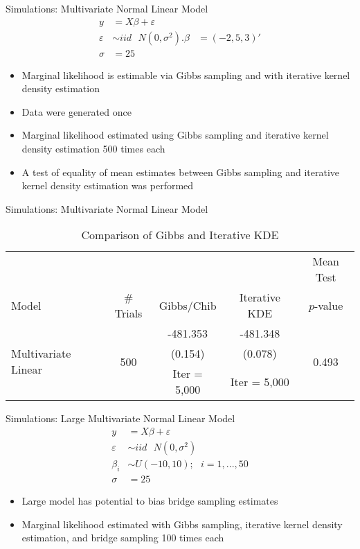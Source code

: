 \documentclass{beamer}
\newcommand{\ep}{\varepsilon}
\begin{document}
\begin{frame}{Simulations: Multivariate Normal Linear Model}
\begin{subequations}
	\begin{align}
	y &= X\beta + \ep \\
	\ep &\sim iid \mbox{ }N(0, \sigma^2). 
	\beta &= (-2, 5, 3)'\\
	\sigma &= 25
	\end{align}
\end{subequations}

\begin{itemize}
	\item Marginal likelihood is estimable via Gibbs sampling and with iterative kernel density estimation
	\item Data were generated once
	\item Marginal likelihood estimated using Gibbs sampling and iterative kernel density estimation 500 times each
	\item A test of equality of mean estimates between Gibbs sampling and iterative kernel density estimation was performed
\end{itemize}
\end{frame}

\begin{frame}{Simulations: Multivariate Normal Linear Model}
\begin{table}
	\centering
	\begin{tabular}{l|c|c|c|c}
		&  &  &  & Mean Test \\ 
		Model & \# Trials & Gibbs/Chib & Iterative KDE & $p$-value \\ 
		\hline
		\hline
		\multirow{3}{*}{Multivariate Linear} & \multirow{3}{*}{500} & -481.353 & -481.348 & \multirow{3}{*}{0.493} \\ 
		&  & (0.154) & (0.078) &  \\ 
		&  & Iter = 5,000 & Iter = 5,000 &  \\ 
		\hline
	\end{tabular}
	\caption{Comparison of Gibbs and Iterative KDE} 
	\label{tab:MVN-Probit}
\end{table}
\end{frame}

\begin{frame}{Simulations: Large Multivariate Normal Linear Model}
\begin{subequations}
	\begin{align}
	y &= X\beta + \ep \\
	\ep &\sim iid \mbox{ }N(0, \sigma^2)\\
	\beta_i &\sim U(-10, 10); \mbox{\ \ \ \ } i = 1, ..., 50\\
	\sigma &= 25
	\end{align}
\end{subequations}
\begin{itemize}
	\item Large model has potential to bias bridge sampling estimates
	\item Marginal likelihood estimated with Gibbs sampling, iterative kernel density estimation, and bridge sampling 100 times each
\end{itemize}
\end{frame}
\end{document}
